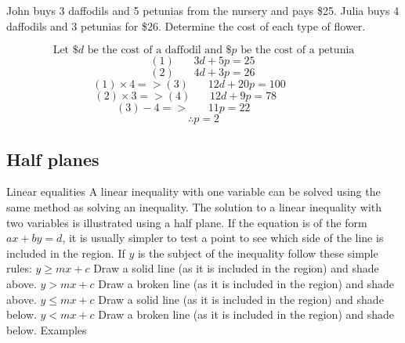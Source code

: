 \begin{outline}
				John buys 3 daffodils and 5 petunias from the nursery and pays \$25. Julia buys 4 daffodils and 3 petunias for \$26. Determine the cost of each type of flower.
				
				\[\text{Let \$$d$ be the cost of a daffodil and \$$p$ be the cost of a petunia}\]
				\[\]
				\[(1)\ \ \ \ \ \ \ \ 3d + 5p = 25\ \]
				\[(2)\ \ \ \ \ \ \ \ 4d + 3p = 26\ \]
				\[(1)\times4 => (3)\ \ \ \ \ \ \ \ 12d + 20p = 100\ \ \ \ \ \ \ \ \ \ \ \ \]
				\[(2)\times3 => (4)\ \ \ \ \ \ \ \ 12d + 9p = 78\ \ \ \ \ \ \ \ \ \ \ \ \ \ \ \]
				\[(3) - 4 =>\ \ \ \ \ \ \ \ 11p = 22\ \ \ \ \ \ \ \ \ \ \ \ \ \ \ \ \ \]
				\[\therefore p = 2\]

\0
\subsection{Half planes}
	\1 Linear equalities
		\2 A linear inequality with one variable can be solved using the same method as solving an inequality.
		\2 The solution to a linear inequality with two variables is illustrated using a half plane.
		\2 If the equation is of the form $ax + by = d$, it is usually simpler to test a point to see which side of the line is included in the region.
		\2 If $y$ is the subject of the inequality follow these simple rules:
			\3 $y \geq mx + c$
				\4 Draw a solid line (as it is included in the region) and shade above.
			\3 $y > mx + c$
				\4 Draw a broken line (as it is included in the region) and shade above.
			\3 $y \leq mx + c$
				\4 Draw a solid line (as it is included in the region) and shade below.
			\3 $y < mx + c$
				\4 Draw a broken line (as it is included in the region) and shade below.
		\2 Examples
\begin{center}
\end{center}
\end{outline}
